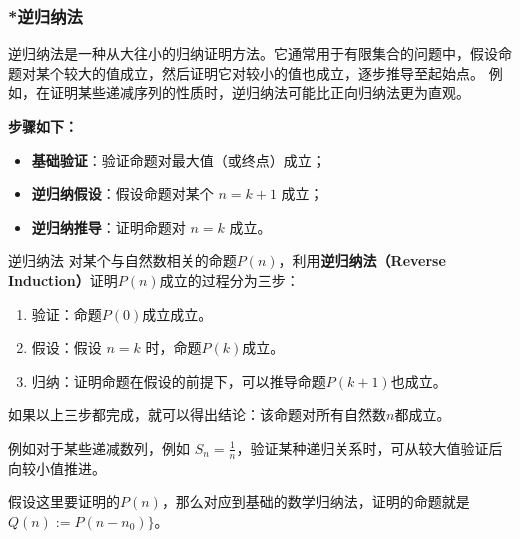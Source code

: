 \subsubsection{*逆归纳法}

逆归纳法是一种从大往小的归纳证明方法。它通常用于有限集合的问题中，假设命题对某个较大的值成立，然后证明它对较小的值也成立，逐步推导至起始点。  
例如，在证明某些递减序列的性质时，逆归纳法可能比正向归纳法更为直观。

\textbf{步骤如下：}
\begin{itemize}
    \item \textbf{基础验证}：验证命题对最大值（或终点）成立；
    \item \textbf{逆归纳假设}：假设命题对某个 $n = k+1$ 成立；
    \item \textbf{逆归纳推导}：证明命题对 $n = k$ 成立。
\end{itemize}

\begin{definition}{逆归纳法}
对某个与自然数相关的命题$P(n)$，利用\textbf{逆归纳法（Reverse Induction）}证明$P(n)$成立的过程分为三步：
\begin{enumerate}
\item 验证：命题$P(0)$成立成立。
\item 假设：假设 $n = k$ 时，命题$P(k)$成立。
\item 归纳：证明命题在假设的前提下，可以推导命题$P(k+1)$也成立。
\end{enumerate}
如果以上三步都完成，就可以得出结论：该命题对所有自然数$n$都成立。
\end{definition}

例如对于某些递减数列，例如 $S_n = \frac{1}{n}$，验证某种递归关系时，可从较大值验证后向较小值推进。

假设这里要证明的$P(n)$，那么对应到基础的数学归纳法，证明的命题就是$Q(n):=P(n-n_0)\}$。